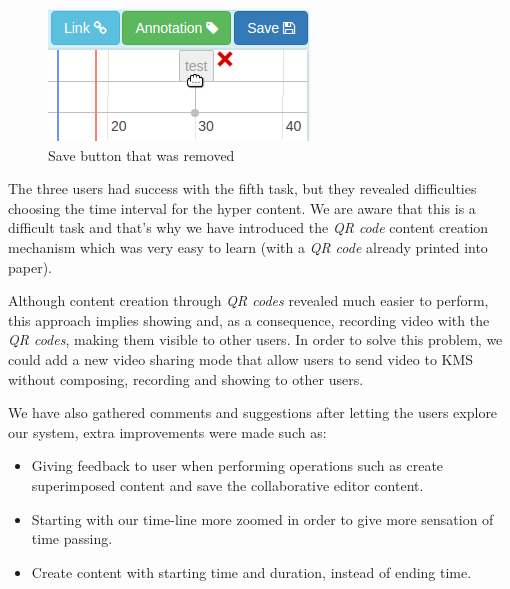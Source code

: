 \begin{figure}
\centering
\begin{minipage}[b]{0.3\linewidth}
\centering

    \includegraphics[width=\textwidth]{figures/test_ui_05.png}
\end{minipage}


    \caption{Save button that was removed}
    \label{fig:test_ui_05}
\end{figure}

The three users had success with the fifth task, but they revealed difficulties choosing the time interval for the hyper content. We are aware that this is a difficult task and that's why we have introduced the \emph{QR code} content creation mechanism which was very easy to learn (with a \emph{QR code} already printed into paper).

Although content creation through \emph{QR codes} revealed much easier to perform, this approach implies showing and, as a consequence, recording video with the \emph{QR codes}, making them visible to other users. In order to solve this problem, we could add a new video sharing mode that allow users to send video to \ac{KMS} without composing, recording and showing to other users.

We have also gathered comments and suggestions after letting the users explore our system, extra improvements were made such as:

\begin{itemize}
\item Giving feedback to user when performing operations such as create superimposed content and save the collaborative editor content.
\item Starting with our time-line more zoomed in order to give more sensation of time passing.
\item Create content with starting time and duration, instead of ending time.
\end{itemize}

